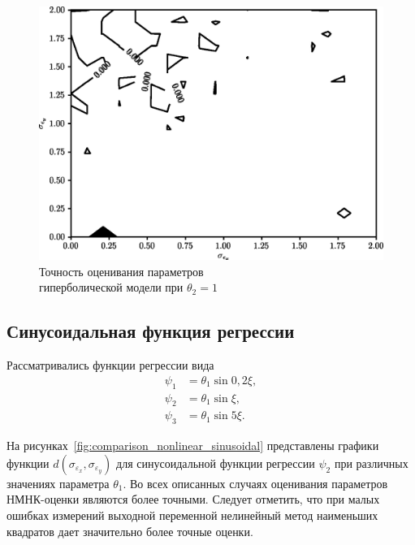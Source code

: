 \begin{figure}[h]
  \centering
  \includegraphics[width=135mm]{fig/nonlinear/hyperbolic/alpha-0_beta-1.png}
  \caption{
    Точность оценивания параметров \\
    гиперболической модели при \( \theta_2 = 1 \)
  }\label{fig:comparison_nonlinear_hyperbolic_alpha-0_beta-1}
\end{figure}



\subsection{Синусоидальная функция регрессии}

Рассматривались функции регрессии вида
\begin{equation*}
  \begin{aligned}
    \psi_1 &= \theta_1 \sin{0{,}2 \xi}, \\
    \psi_2 &= \theta_1 \sin{\xi}, \\
    \psi_3 &= \theta_1 \sin{5 \xi}.
  \end{aligned}
\end{equation*}

На рисунках~\ref{fig:comparison_nonlinear_sinusoidal}
представлены графики функции \( d(\sigma_{\varepsilon_x}, \sigma_{\varepsilon_y}) \)
для синусоидальной функции регрессии \( \psi_2 \) при
различных значениях параметра \( \theta_1 \).
Во всех описанных случаях оценивания параметров
НМНК-оценки являются более точными.
Следует отметить, что при малых ошибках измерений выходной переменной
нелинейный метод наименьших квадратов дает значительно более точные оценки.


